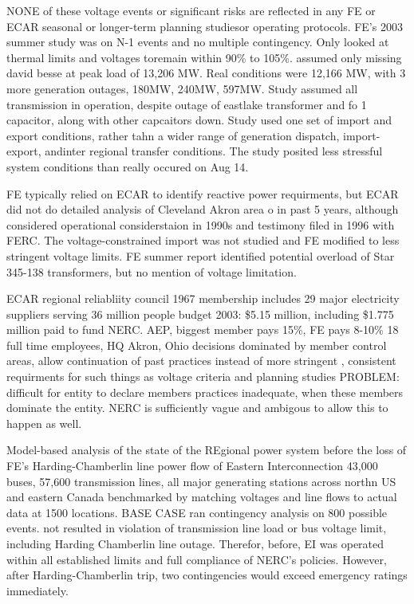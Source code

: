 NONE of these voltage events or significant risks are reflected in any FE or ECAR seasonal or longer-term planning studiesor operating protocols.  FE's 2003 summer study was on N-1 events and no multiple contingency.  Only looked at thermal limits and voltages toremain within 90\% to 105\%.  assumed only missing david besse at peak load of 13,206 MW.  Real conditions were 12,166 MW, with 3 more generation outages, 180MW, 240MW, 597MW.  Study assumed all transmission in operation, despite outage of eastlake transformer and fo 1 capacitor, along with other capcaitors down.  Study used one set of import and export conditions, rather tahn a wider range of generation dispatch, import-export, andinter regional transfer conditions.  The study posited less stressful system conditions than really occured on Aug 14.

FE typically relied on ECAR to identify reactive power requirments, but ECAR did not do detailed analysis of Cleveland Akron area o in past 5 years, although considered operational considerstaion in 1990s and testimony filed in 1996 with FERC.  The voltage-constrained import was not studied and FE modified to less stringent voltage limits.  FE summer report identified potential overload of Star 345-138 transformers, but no mention of voltage limitation.

ECAR regional reliabliity council 1967
membership includes 29 major electricity suppliers serving 36 million people
budget 2003: \$5.15 million, including \$1.775 million paid to fund NERC.
AEP, biggest member pays 15\%, FE pays 8-10\%
18 full time employees, HQ Akron, Ohio
decisions dominated by member control areas, allow continuation of past practices instead of more stringent , consistent requirments for such things as voltage criteria and planning studies
PROBLEM: difficult for entity to declare members practices inadequate, when these members dominate the entity.  NERC is sufficiently vague and ambigous to allow this to happen as well.


Model-based analysis of the state of the REgional power system before the loss of FE's Harding-Chamberlin line
power flow of Eastern Interconnection
43,000 buses, 57,600 transmission lines, all major generating stations across northn US and eastern Canada
benchmarked by matching voltages and line flows to actual data at 1500 locations.  BASE CASE
ran contingency analysis on 800 possible events.  not resulted in violation of transmission line load or bus voltage limit, including Harding Chamberlin line outage.
Therefor, before, EI was operated within all established limits and full compliance of NERC's policies.  However, after Harding-Chamberlin trip, two contingencies would exceed emergency ratings immediately.

